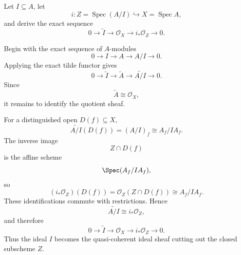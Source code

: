 \begin{problem}\label{prob:vi33-03}
Let \(I\subseteq A\), let
\[
i:Z=\operatorname{Spec}(A/I)\hookrightarrow X=\operatorname{Spec}A,
\]
and derive the exact sequence
\[
0\to\widetilde I\to\mathcal O_X\to i_*\mathcal O_Z\to0.
\]
\end{problem}

\ifdefined\FullProblemDossiers
\begin{solution}
Begin with the exact sequence of \(A\)-modules
\[
0\longrightarrow I\longrightarrow A\longrightarrow A/I\longrightarrow0.
\]
Applying the exact tilde functor gives
\[
0\longrightarrow\widetilde I
\longrightarrow\widetilde A
\longrightarrow\widetilde{A/I}
\longrightarrow0.
\]
Since
\[
\widetilde A\cong\mathcal O_X,
\]
it remains to identify the quotient sheaf.

For a distinguished open \(D(f)\subseteq X\),
\[
\widetilde{A/I}(D(f))
=
(A/I)_f
\cong
A_f/IA_f.
\]
The inverse image
\[
Z\cap D(f)
\]
is the affine scheme
\[
\Spec(A_f/IA_f),
\]
so
\[
(i_*\mathcal O_Z)(D(f))
=
\mathcal O_Z(Z\cap D(f))
\cong
A_f/IA_f.
\]
These identifications commute with restrictions. Hence
\[
\widetilde{A/I}\cong i_*\mathcal O_Z,
\]
and therefore
\[
\boxed{
0\to\widetilde I\to\mathcal O_X\to i_*\mathcal O_Z\to0.
}
\]
Thus the ideal \(I\) becomes the quasi-coherent ideal sheaf cutting out the closed subscheme \(Z\).
\end{solution}
\fi
